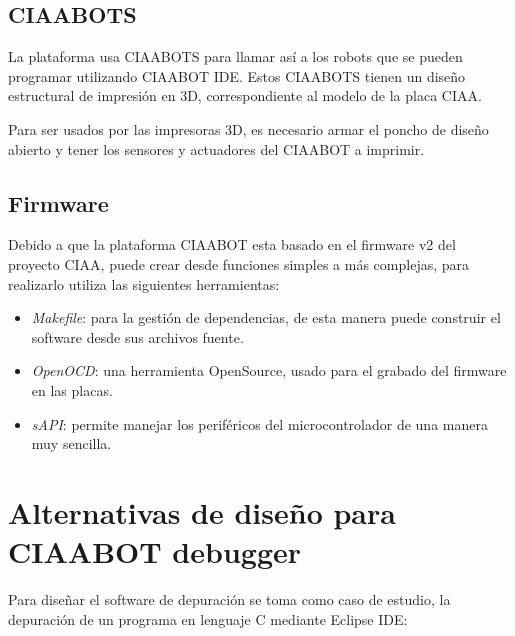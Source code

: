 \subsection{CIAABOTS}
\label{subsec:CIAABOTS}

La plataforma usa CIAABOTS para llamar así a los robots que se pueden programar utilizando CIAABOT IDE. Estos CIAABOTS tienen un diseño estructural de impresión en 3D, correspondiente al modelo de la placa CIAA. 

Para ser usados por las impresoras 3D, es necesario armar el poncho de diseño abierto y tener los sensores y actuadores del CIAABOT a imprimir.

\subsection{Firmware}
\label{subsec:Firmware}

Debido a que la plataforma CIAABOT esta basado en el firmware v2 \citep{CIAA:firmwarev2} del proyecto CIAA, puede crear desde funciones simples a más complejas, para realizarlo
utiliza las siguientes herramientas:

\begin{itemize}
	\item \emph{Makefile}: para la gestión de dependencias, de esta manera puede construir
	el software desde sus archivos fuente.	
	\item \emph{OpenOCD}: una herramienta OpenSource, usado para el grabado del firmware
	en las placas.
	\item \emph{sAPI}\citep{sAPI}: permite manejar los periféricos del microcontrolador de una manera
	muy sencilla.
\end{itemize}


\section{Alternativas de diseño para CIAABOT debugger}
\label{sec:Alternativas de diseño para CIAABOT debugger}

Para diseñar el software de depuración se toma como caso de estudio, la depuración de un programa en lenguaje C mediante Eclipse IDE:

